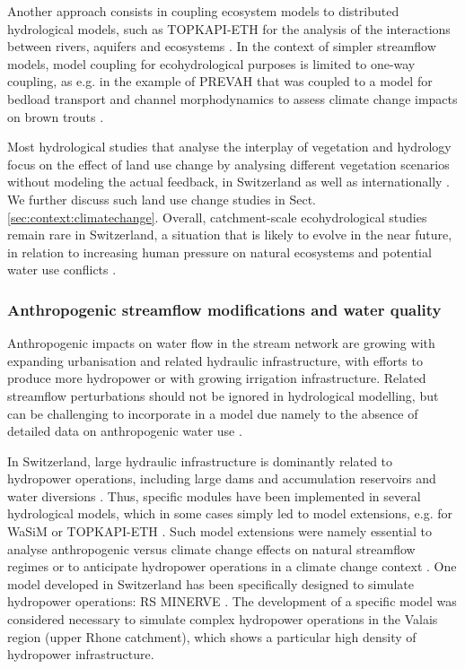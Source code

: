 \documentclass[10pt,a4paper]{article}
\begin{document}
Another approach consists in coupling ecosystem models to distributed hydrological models, such as TOPKAPI-ETH for the analysis of the interactions between rivers, aquifers and ecosystems \citep{Foglia2009, Pappas2015}. In the context of simpler streamflow models, model coupling for ecohydrological purposes is limited to one-way coupling, as e.g. in the example of PREVAH that was coupled to a model for bedload transport and channel morphodynamics to assess climate change impacts on brown trouts \citep{Junker2015}. 

Most hydrological studies that analyse the interplay of vegetation and hydrology focus on the effect of land use change by analysing different vegetation scenarios without modeling the actual feedback, in Switzerland as well as internationally \citep{Dwarakish2015}. We further discuss such land use change studies in Sect. \ref{sec:context:climatechange}. Overall, catchment-scale ecohydrological studies remain rare in Switzerland, a situation that is likely to evolve in the near future, in relation to increasing human pressure on natural ecosystems and potential water use conflicts \citep{Milano2016}.


\subsubsection{Anthropogenic streamflow modifications and water quality}
\label{sec:context:infrastructures}

Anthropogenic impacts on water flow in the stream network are growing with expanding urbanisation and related hydraulic infrastructure, with efforts to produce more hydropower \citep{Schaefli2018} or with growing irrigation infrastructure. Related streamflow perturbations should not be ignored in hydrological modelling, but can be challenging to incorporate in a model due namely to the absence of detailed data on anthropogenic water use \citep{FOEN2021}.

In Switzerland, large hydraulic infrastructure is dominantly related to hydropower operations, including large dams and accumulation reservoirs and water diversions \citep{Schaefli2018}. Thus, specific modules have been implemented in several hydrological models, which in some cases simply led to model extensions, e.g. for WaSiM \citep{Verbunt2005} or TOPKAPI-ETH \citep{Fatichi2014}. Such model extensions were namely essential to analyse anthropogenic versus climate change effects on natural streamflow regimes \citep{Fatichi2014} or to anticipate hydropower operations in a climate change context \citep{Fatichi2015b, Anghileri2018}. One model developed in Switzerland has been specifically designed to simulate hydropower operations: RS MINERVE \citep{GarciaHernandez2020, Foehn2020}. The development of a specific model was considered necessary to simulate complex hydropower operations in the Valais region (upper Rhone catchment), which shows a particular high density of hydropower infrastructure.
\end{document}
